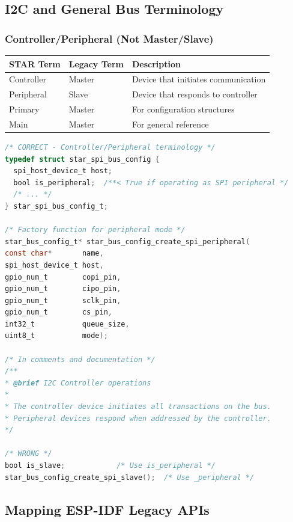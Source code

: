 \subsection{I2C and General Bus Terminology}

\subsubsection{Controller/Peripheral (Not Master/Slave)}

\begin{center}
\begin{tabular}{|l|l|l|}
\hline
\textbf{STAR Term} & \textbf{Legacy Term} & \textbf{Description} \\
\hline
Controller & Master & Device that initiates communication \\
\hline
Peripheral & Slave & Device that responds to controller \\
\hline
Primary & Master & For configuration structures \\
\hline
Main & Master & For general reference \\
\hline
\end{tabular}
\end{center}

\begin{lstlisting}[language=C]
/* CORRECT - Controller/Peripheral terminology */
typedef struct star_spi_bus_config {
  spi_host_device_t host;
  bool is_peripheral;  /**< True if operating as SPI peripheral */
  /* ... */
} star_spi_bus_config_t;

/* Factory function for peripheral mode */
star_bus_config_t* star_bus_config_create_spi_peripheral(
const char*       name,
spi_host_device_t host,
gpio_num_t        copi_pin,
gpio_num_t        cipo_pin,
gpio_num_t        sclk_pin,
gpio_num_t        cs_pin,
int32_t           queue_size,
uint8_t           mode);

/* In comments and documentation */
/**
* @brief I2C Controller operations
*
* The controller device initiates all transactions on the bus.
* Peripheral devices respond when addressed by the controller.
*/

/* WRONG */
bool is_slave;            /* Use is_peripheral */
star_bus_config_create_spi_slave();  /* Use _peripheral */
\end{lstlisting}

\subsection{Mapping ESP-IDF Legacy APIs}


